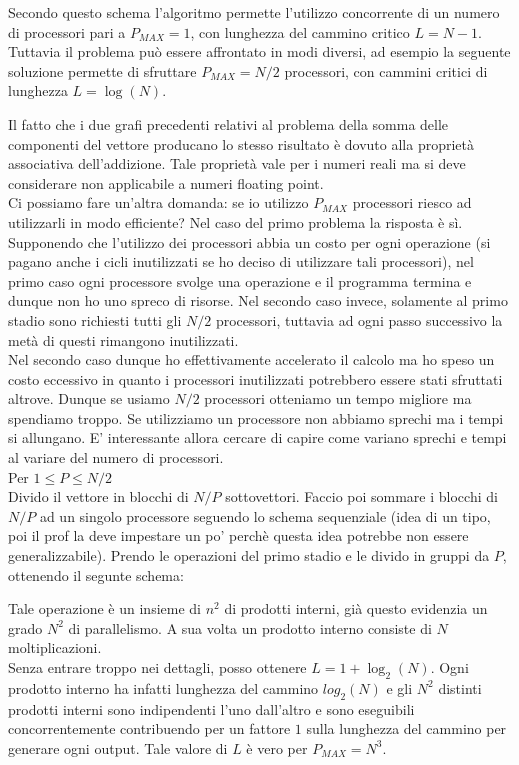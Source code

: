 \documentclass[a4paper,portrait,12pt]{article}
\theoremstyle{definition}
\begin{document}
Secondo questo schema l’algoritmo permette l’utilizzo concorrente di un numero di processori pari a $P_{MAX} = 1$, con lunghezza del cammino critico $L = N - 1$.\\
Tuttavia il problema può essere affrontato in modi diversi, ad esempio la seguente soluzione permette
di sfruttare $P_{MAX} = N / 2$ processori, con cammini critici di lunghezza $L = \log(N)$.



Il fatto che i due grafi precedenti relativi al problema della somma delle componenti del vettore producano lo stesso risultato è dovuto alla proprietà associativa dell’addizione. Tale proprietà vale per i numeri reali ma si deve considerare non applicabile a numeri floating point.\\

Ci possiamo fare un’altra domanda: se io utilizzo $P_{MAX}$ processori riesco ad utilizzarli in modo efficiente? Nel caso del primo problema la risposta è sì. 
Supponendo che l’utilizzo dei processori abbia un costo per ogni operazione (si pagano anche i cicli inutilizzati se ho deciso di utilizzare tali processori), nel primo caso ogni processore svolge una operazione e il programma termina e dunque non ho uno spreco di risorse. 
Nel secondo caso invece, solamente al primo stadio sono richiesti tutti gli $N/2$ processori, tuttavia ad ogni passo successivo la metà di questi rimangono inutilizzati.\\
Nel secondo caso dunque ho effettivamente accelerato il calcolo ma ho speso un costo eccessivo in quanto i processori inutilizzati potrebbero essere stati sfruttati altrove.
Dunque se usiamo $N/2$ processori otteniamo un tempo migliore ma spendiamo troppo.
Se utilizziamo un processore non abbiamo sprechi ma i tempi si allungano. E’ interessante allora cercare di capire come variano sprechi e tempi al variare del numero di processori.\\

Per $1 \le P \le N/2$\\

Divido il vettore in blocchi di $N/P$ sottovettori. Faccio poi sommare i blocchi di $N/P$ ad un singolo processore seguendo lo schema sequenziale (idea di un tipo, poi il prof la deve impestare un po’ perchè questa idea potrebbe non essere generalizzabile).
Prendo le operazioni del primo stadio e le divido in gruppi da $P$, ottenendo il segunte schema:

Tale operazione è un insieme di $n^2$ di prodotti interni, già questo evidenzia un grado $N^2$ di parallelismo.
A sua volta un prodotto interno consiste di $N$ moltiplicazioni.\\
Senza entrare troppo nei dettagli, posso ottenere $L = 1 + \log_2(N)$.
Ogni prodotto interno ha infatti lunghezza del cammino $log_2(N)$ e gli $N^2$ distinti prodotti interni sono indipendenti l’uno dall’altro e sono eseguibili concorrentemente contribuendo per un fattore $1$ sulla lunghezza del cammino per generare ogni output.
Tale valore di $L$ è vero per $P_{MAX} = N^3$.\\
\end{document}
